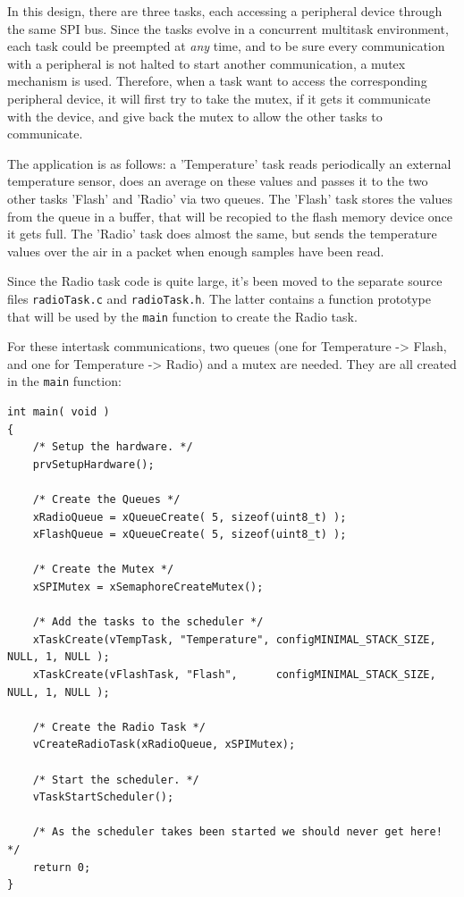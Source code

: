 \documentclass[11pt]{report}
\begin{document}
In this design, there are three tasks, each accessing a peripheral device through the same SPI bus. Since the tasks evolve in a concurrent multitask environment, each task could be preempted at \textit{any} time, and to be sure every communication with a peripheral is not halted to start another communication, a mutex mechanism is used. Therefore, when a task want to access the corresponding peripheral device, it will first try to take the mutex, if it gets it communicate with the device, and give back the mutex to allow the other tasks to communicate.

The application is as follows: a 'Temperature' task reads periodically an external temperature sensor, does an average on these values and passes it to the two other tasks 'Flash' and 'Radio' via two queues. The 'Flash' task stores the values from the queue in a buffer, that will be recopied to the flash memory device once it gets full. The 'Radio' task does almost the same, but sends the temperature values over the air in a packet when enough samples have been read.

Since the Radio task code is quite large, it's been moved to the separate source files \verb$radioTask.c$ and \verb$radioTask.h$. The latter contains a function prototype that will be used by the \verb$main$ function to create the Radio task.

For these intertask communications, two queues (one for Temperature -> Flash, and one for Temperature -> Radio) and a mutex are needed. They are all created in the \verb$main$ function:
\begin{verbatim}
int main( void )
{
    /* Setup the hardware. */
    prvSetupHardware();

    /* Create the Queues */
    xRadioQueue = xQueueCreate( 5, sizeof(uint8_t) );
    xFlashQueue = xQueueCreate( 5, sizeof(uint8_t) );

    /* Create the Mutex */
    xSPIMutex = xSemaphoreCreateMutex();

    /* Add the tasks to the scheduler */
    xTaskCreate(vTempTask, "Temperature", configMINIMAL_STACK_SIZE, NULL, 1, NULL );
    xTaskCreate(vFlashTask, "Flash",      configMINIMAL_STACK_SIZE, NULL, 1, NULL );

    /* Create the Radio Task */
    vCreateRadioTask(xRadioQueue, xSPIMutex);

    /* Start the scheduler. */
    vTaskStartScheduler();

    /* As the scheduler takes been started we should never get here! */
    return 0;
}
\end{verbatim}
\end{document}
